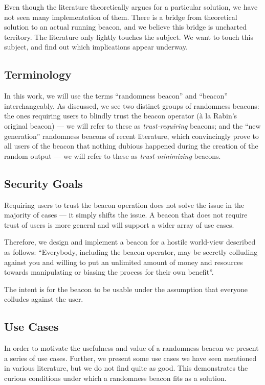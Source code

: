 Even though the literature theoretically argues for a particular solution, we have not seen many implementation of them. There is a bridge from theoretical solution to an actual running beacon, and we believe this bridge is uncharted territory. The literature only lightly touches the subject. We want to touch this subject, and find out which implications appear underway.

\subsection{Terminology}
In this work, we will use the terms \enquote{randomness beacon} and \enquote{beacon} interchangeably. %
As discussed, we see two distinct groups of randomness beacons: the ones requiring users to blindly trust the beacon operator (à la Rabin's original beacon) --- we will refer to these as \emph{trust-requiring} beacons; and the \enquote{new generation} randomness beacons of recent literature, which convincingly prove to all users of the beacon that nothing dubious happened during the creation of the random output --- we will refer to these as \emph{trust-minimizing} beacons.


\subsection{Security Goals}\label{sec:security_goals}
Requiring users to trust the beacon operation does not solve the issue in the majority of cases --- it simply shifts the issue. A beacon that does not require trust of users is more general and will support a wider array of use cases.

Therefore, we design and implement a beacon for a hostile world-view described as follows:
\enquote{Everybody, including the beacon operator, may be secretly colluding against you and willing to put an unlimited amount of money and resources towards manipulating or biasing the process for their own benefit}.

The intent is for the beacon to be usable under the assumption that everyone colludes against the user.

\subsection{Use Cases}
In order to motivate the usefulness and value of a randomness beacon we present a series of use cases. Further, we present some use cases we have seen mentioned in various literature, but we do not find quite as good. This demonstrates the curious conditions under which a randomness beacon fits as a solution.

